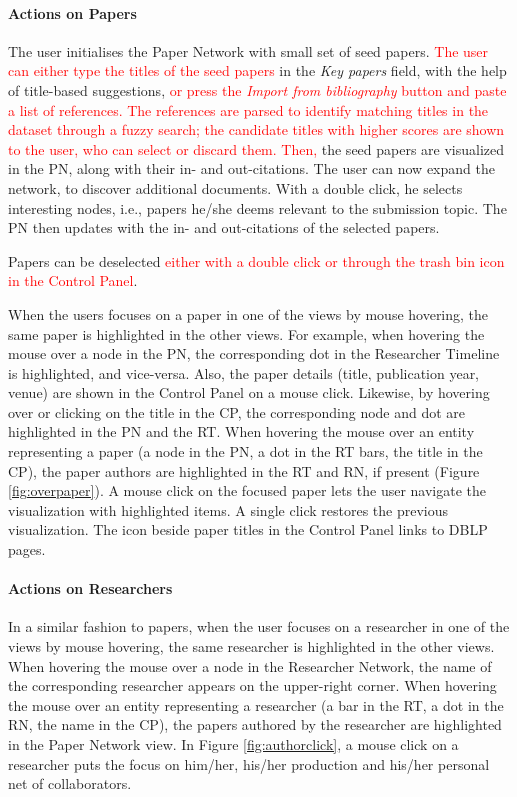 \paragraph*{Actions on Papers} 
The user initialises the Paper Network with small set of seed papers. \textcolor{red}{The user can either type the titles of the seed papers} in the \emph{Key papers} field, with the help of title-based suggestions, \textcolor{red}{or press the \emph{Import from bibliography} button and paste a list of references. The references are parsed to identify matching titles in the dataset through a fuzzy search; the candidate titles with higher scores are shown to the user, who can select or discard them. Then,} the seed papers are visualized in the PN, along with their in- and out-citations. The user can now expand the network, to discover additional documents. With a double click, he selects interesting nodes, i.e., papers he/she deems relevant to the submission topic. The PN then updates with the in- and out-citations of the selected papers. 

Papers can be deselected \textcolor{red}{either with a double click or through the trash bin icon in the Control Panel}. 

When the users focuses on a paper in one of the views by mouse hovering, the same paper is highlighted in the other views. For example, when hovering the mouse over a node in the PN, the corresponding dot in the Researcher Timeline is highlighted, and vice-versa. Also, the paper details (title, publication year, venue) are shown in the Control Panel on a mouse click. Likewise, by hovering over or clicking on the title in the CP, the corresponding node and dot are highlighted in the PN and the RT. When hovering the mouse over an entity representing a paper (a node in the PN, a dot in the RT bars, the title in the CP), the paper authors are highlighted in the RT and RN, if present (Figure \ref{fig:overpaper}). A mouse click on the focused paper lets the user navigate the visualization with highlighted items. A single click restores the previous visualization.
The icon beside paper titles in the Control Panel links to DBLP pages. 

\paragraph*{Actions on Researchers} In a similar fashion to papers, when the user focuses on a researcher in one of the views by mouse hovering, the same researcher is highlighted in the other views. When hovering the mouse over a node in the Researcher Network, the name of the corresponding researcher appears on the upper-right corner.  
When hovering the mouse over an entity representing a researcher (a bar in the RT, a dot in the RN, the name in the CP), the papers authored by the researcher are highlighted in the Paper Network view. 
In Figure \ref{fig:authorclick}, a mouse click on a researcher puts the focus on him/her, his/her production and his/her personal net of collaborators. 

